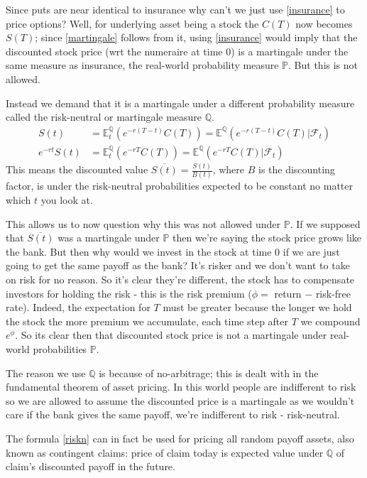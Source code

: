 \documentclass[9pt]{extarticle}
\begin{document}
Since puts are near identical to insurance why can't we just use \eqref{insurance} to price options? Well, for underlying 
asset being a stock the $C(T)$ now becomes $S(T)$; since \eqref{martingale} follows from it, using \eqref{insurance} would imply that 
the discounted stock price (wrt the numeraire at time $0$) is a martingale under the same measure as insurance, the real-world probability measure $\mathbb{P}$. But 
this is not allowed.

Instead we demand that it is a martingale under a different probability measure called the risk-neutral or martingale measure $\mathbb{Q}$.
\begin{align}\label{riskn}
    S(t) &= \mathbb{E}_t^{\mathbb{Q}}(e^{-r(T-t)}C(T)) = \mathbb{E}^{\mathbb{Q}}(e^{-r(T-t)}C(T)| \mathcal{F}_t) \\
    e^{-rt}S(t) &= \mathbb{E}_t^{\mathbb{Q}}(e^{-rT}C(T)) = \mathbb{E}^{\mathbb{Q}}(e^{-rT}C(T)| \mathcal{F}_t)
\end{align} 
This means the discounted value $\overline{S(t)}=\frac{S(t)}{B(t)}$, where $B$ is the discounting factor, is under the risk-neutral 
probabilities expected to be constant no
matter which $t$ you look at. 

This allows us to now question why this was not allowed under $\mathbb{P}$. If we supposed that $\overline{S(t)}$ was a 
martingale under $\mathbb{P}$ then we're saying the stock price grows like the bank. But then why would we invest in the stock at time $0$ if we are just going to get 
the same payoff as the bank? It's risker and we don't want to take on risk for no reason. So it's clear they're different, the stock has 
to compensate investors for holding the risk - this is the risk premium ($\phi=$ return $-$ risk-free rate). 
Indeed, the expectation for $T$ must be greater because the longer we hold the stock the more 
premium we accumulate, each time step after $T$ we compound $e^\phi$. So its clear then that discounted 
stock price is not a martingale under real-world probabilities $\mathbb{P}$. 

The reason we use $\mathbb{Q}$ is because of no-arbitrage; this is dealt with in the fundamental theorem of asset pricing. In this world people are indifferent to risk 
so we are allowed to assume the discounted price is a martingale as we wouldn't care if the bank gives 
the same payoff, we're indifferent to risk - risk-neutral.

The formula \eqref{riskn} can in fact be used for pricing all random payoff assets, also known as contingent claims: price of claim today is 
expected value under $\mathbb{Q}$ of claim's discounted payoff in the future.
\end{document}
